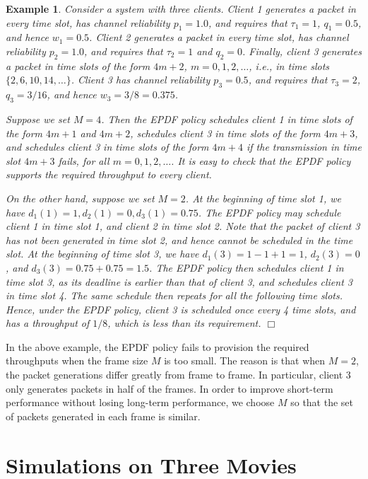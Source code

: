 \documentclass[10pt,nocopyrightspace]{sigplan-proc-varsize-1in}
\newtheorem{example}{Example}
\begin{document}
\begin{example}	\label{example:smallM}
Consider a system with three clients. Client 1 generates a packet in every time slot, has channel reliability $p_1=1.0$, and requires that $\tau_1=1$, $q_1=0.5$, and hence $w_1=0.5$. Client 2 generates a packet in every time slot, has channel reliability $p_2=1.0$, and requires that $\tau_2=1$ and $q_2=0$. Finally, client 3 generates a packet in time slots of the form $4m+2$, $m=0,1,2,\dots$, i.e., in time slots $\{2,6,10,14,\dots\}$. Client 3 has channel reliability $p_3=0.5$, and requires that $\tau_3=2$, $q_3=3/16$, and hence $w_3=3/8=0.375$.

Suppose we set $M=4$. Then the EPDF policy schedules client 1 in time slots of the form $4m+1$ and $4m+2$, schedules client 3 in time slots of the form $4m+3$, and schedules client 3 in time slots of the form $4m+4$ if the transmission in time slot $4m+3$ fails, for all $m=0,1,2,\dots$. It is easy to check that the EPDF policy supports the required throughput to every client.

On the other hand, suppose we set $M=2$. At the beginning of time slot 1, we have $d_1(1)=1, d_2(1)=0, d_3(1)=0.75$. The EPDF policy may schedule client 1 in time slot 1, and client 2 in time slot 2. Note that the packet of client 3 has not been generated in time slot 2, and hence cannot be scheduled in the time slot. At the beginning of time slot 3, we have $d_1(3)=1-1+1=1$, $d_2(3)=0$, and $d_3(3) = 0.75+0.75=1.5$. The EPDF policy then schedules client 1 in time slot 3, as its deadline is earlier than that of client 3, and schedules client 3 in time slot 4. The same schedule then repeats for all the following time slots. Hence, under the EPDF policy, client 3 is scheduled once every 4 time slots, and has a throughput of $1/8$, which is less than its requirement. $\Box$
\end{example}

In the above example, the EPDF policy fails to provision the required throughputs when the frame size $M$ is too small. The reason is that when $M=2$, the packet generations differ greatly from frame to frame. In particular, client 3 only generates packets in half of the frames. In order to improve short-term performance without losing long-term performance, we choose $M$ so that the set of packets generated in each frame is similar.

\section{Simulations on Three Movies}  \label{section:simulations}
\end{document}
